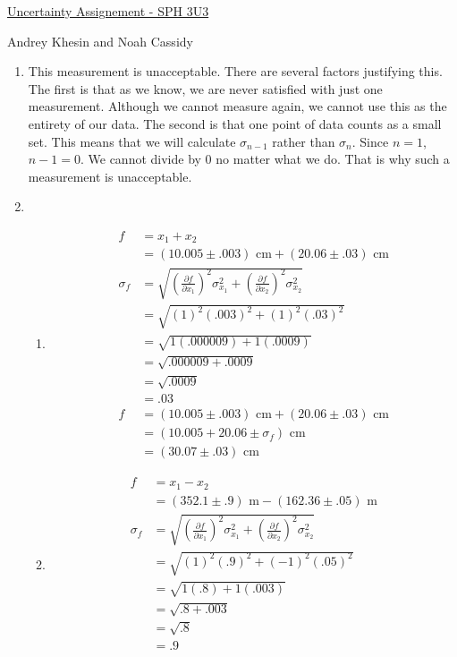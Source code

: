 \documentclass{article}
\begin{document}
\centerline{\sc \large \underline{Uncertainty Assignement - SPH 3U3}}
\centerline{\sc Andrey Khesin and Noah Cassidy}
\centerline{}

\begin{enumerate}
\item This measurement is unacceptable. There are several factors justifying this. The first is that as we know, we are never satisfied with just one measurement. Although we cannot measure again, we cannot use this as the entirety of our data. The second is that one point of data counts as a small set. This means that we will calculate $\sigma_{n - 1}$ rather than $\sigma_{n}$. Since $n = 1$, $n - 1 = 0$. We cannot divide by 0 no matter what we do. That is why such a measurement is unacceptable.
\item
\begin{enumerate}
\item
\begin{align*}
f &= x_1 + x_2\\
&= (10.005 \pm .003)\text{ cm} + (20.06 \pm .03)\text{ cm}\\
\sigma_{f} &= \sqrt{(\frac{\partial f}{\partial x_1})^2\sigma_{x_1}^2 + (\frac{\partial f}{\partial x_2})^2\sigma_{x_2}^2}\\
&= \sqrt{(1)^2(.003)^2 + (1)^2(.03)^2}\\
&= \sqrt{1(.000009) + 1(.0009)}\\
&= \sqrt{.000009 + .0009}\\
&= \sqrt{.0009}\\
&= .03\\
f &= (10.005 \pm .003)\text{ cm} + (20.06 \pm .03)\text{ cm}\\
&= (10.005 + 20.06 \pm \sigma_{f})\text{ cm}\\
&= (30.07 \pm .03)\text{ cm}
\end{align*}
\item
\begin{align*}
f &= x_1 - x_2\\
&= (352.1 \pm .9)\text{ m} - (162.36 \pm .05)\text{ m}\\
\sigma_{f} &= \sqrt{(\frac{\partial f}{\partial x_1})^2\sigma_{x_1}^2 + (\frac{\partial f}{\partial x_2})^2\sigma_{x_2}^2}\\
&= \sqrt{(1)^2(.9)^2 + (-1)^2(.05)^2}\\
&= \sqrt{1(.8) + 1(.003)}\\
&= \sqrt{.8 + .003}\\
&= \sqrt{.8}\\
&= .9\\

\end{align*}
\end{enumerate}
\end{enumerate}
\end{document}
